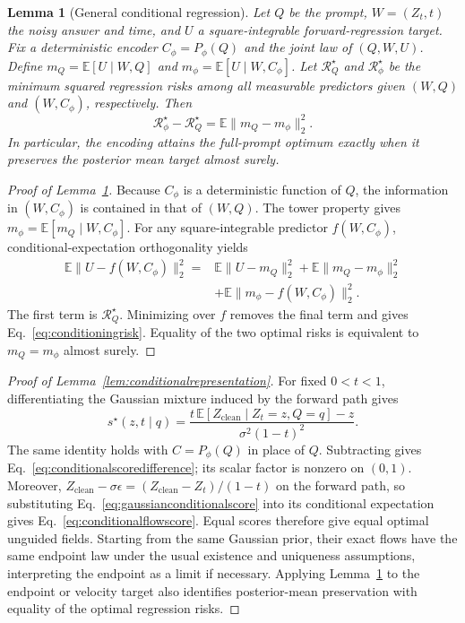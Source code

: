 \documentclass[11pt,letterpaper]{article}
\newcommand{\E}{\mathbb{E}}
\newtheorem{lemma}{Lemma}
\begin{document}
\begin{lemma}[General conditional regression]
\label{lem:conditionalregression}
Let $Q$ be the prompt, $W=(Z_t,t)$ the noisy answer and time, and $U$ a square-integrable forward-regression target. Fix a deterministic encoder $C_\phi=P_\phi(Q)$ and the joint law of $(Q,W,U)$. Define $m_Q=\E[U\mid W,Q]$ and $m_\phi=\E[U\mid W,C_\phi]$. Let $\mathcal R_Q^\star$ and $\mathcal R_\phi^\star$ be the minimum squared regression risks among all measurable predictors given $(W,Q)$ and $(W,C_\phi)$, respectively. Then
\begin{equation}
 \mathcal R_\phi^\star-\mathcal R_Q^\star
 =\E\|m_Q-m_\phi\|_2^2.
 \label{eq:conditioningrisk}
\end{equation}
In particular, the encoding attains the full-prompt optimum exactly when it preserves the posterior mean target almost surely.
\end{lemma}

\begin{proof}[Proof of Lemma~\ref{lem:conditionalregression}]
Because $C_\phi$ is a deterministic function of $Q$, the information in $(W,C_\phi)$ is contained in that of $(W,Q)$. The tower property gives $m_\phi=\E[m_Q\mid W,C_\phi]$. For any square-integrable predictor $f(W,C_\phi)$, conditional-expectation orthogonality yields
\begin{equation}
\begin{split}
 \E\|U-f(W,C_\phi)\|_2^2
 ={}&\E\|U-m_Q\|_2^2+\E\|m_Q-m_\phi\|_2^2\\
 &+\E\|m_\phi-f(W,C_\phi)\|_2^2.
\end{split}
\label{eq:conditioningdecomposition}
\end{equation}
The first term is $\mathcal R_Q^\star$. Minimizing over $f$ removes the final term and gives Eq.~\eqref{eq:conditioningrisk}. Equality of the two optimal risks is equivalent to $m_Q=m_\phi$ almost surely.
\end{proof}

\begin{proof}[Proof of Lemma~\ref{lem:conditionalrepresentation}]
For fixed $0<t<1$, differentiating the Gaussian mixture induced by the forward path gives
\begin{equation}
 s^\star(z,t\mid q)
 =\frac{t\,\E[Z_{\mathrm{clean}}\mid Z_t=z,Q=q]-z}{\sigma^2(1-t)^2}.
 \label{eq:gaussianconditionalscore}
\end{equation}
The same identity holds with $C=P_\phi(Q)$ in place of $Q$. Subtracting gives Eq.~\eqref{eq:conditionalscoredifference}; its scalar factor is nonzero on $(0,1)$. Moreover, $Z_{\mathrm{clean}}-\sigma\epsilon=(Z_{\mathrm{clean}}-Z_t)/(1-t)$ on the forward path, so substituting Eq.~\eqref{eq:gaussianconditionalscore} into its conditional expectation gives Eq.~\eqref{eq:conditionalflowscore}. Equal scores therefore give equal optimal unguided fields. Starting from the same Gaussian prior, their exact flows have the same endpoint law under the usual existence and uniqueness assumptions, interpreting the endpoint as a limit if necessary. Applying Lemma~\ref{lem:conditionalregression} to the endpoint or velocity target also identifies posterior-mean preservation with equality of the optimal regression risks.
\end{proof}
\end{document}
